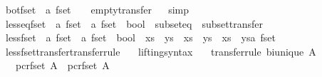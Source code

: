 \begin{isabellebody}
\ bot{\isacharunderscore}fset\ {\isacharcolon}{\isacharcolon}\ {\isachardoublequoteopen}{\isacharprime}a\ fset{\isachardoublequoteclose}\ \ {\isachardoublequoteopen}{\isacharbraceleft}{\isacharbraceright}{\isachardoublequoteclose}\ \ empty{\isacharunderscore}transfer%
\isadelimproof
\ %
\endisadelimproof
%
\isatagproof
{}\isamarkupfalse%
\ simp%
\endisatagproof
{\isafoldproof}%
%
\isadelimproof
%
\endisadelimproof
\isanewline
\isanewline
{}\isamarkupfalse%
\ less{\isacharunderscore}eq{\isacharunderscore}fset\ {\isacharcolon}{\isacharcolon}\ {\isachardoublequoteopen}{\isacharprime}a\ fset\ {\isasymRightarrow}\ {\isacharprime}a\ fset\ {\isasymRightarrow}\ bool{\isachardoublequoteclose}\ \ subset{\isacharunderscore}eq\ \ subset{\isacharunderscore}transfer\isanewline
%
\isadelimproof
\ \ %
\endisadelimproof
%
\isatagproof
\isacommand{{\isachardot}}\isamarkupfalse%
%
\endisatagproof
{\isafoldproof}%
%
\isadelimproof
\isanewline
%
\endisadelimproof
\isanewline
{}\isamarkupfalse%
\ less{\isacharunderscore}fset\ {\isacharcolon}{\isacharcolon}\ {\isachardoublequoteopen}{\isacharprime}a\ fset\ {\isasymRightarrow}\ {\isacharprime}a\ fset\ {\isasymRightarrow}\ bool{\isachardoublequoteclose}\ \ {\isachardoublequoteopen}xs\ {\isacharless}\ ys\ {\isasymequiv}\ xs\ {\isasymle}\ ys\ {\isasymand}\ xs\ {\isasymnoteq}\ {\isacharparenleft}ys{\isacharcolon}{\isacharcolon}{\isacharprime}a\ fset{\isacharparenright}{\isachardoublequoteclose}\isanewline
\isanewline
{}\isamarkupfalse%
\ less{\isacharunderscore}fset{\isacharunderscore}transfer{\isacharbrackleft}transfer{\isacharunderscore}rule{\isacharbrackright}{\isacharcolon}\isanewline
\ \ \ lifting{\isacharunderscore}syntax\isanewline
\ \ \ {\isacharbrackleft}transfer{\isacharunderscore}rule{\isacharbrackright}{\isacharcolon}\ {\isachardoublequoteopen}bi{\isacharunderscore}unique\ A{\isachardoublequoteclose}\isanewline
\ \ \ {\isachardoublequoteopen}{\isacharparenleft}{\isacharparenleft}pcr{\isacharunderscore}fset\ A{\isacharparenright}\ {\isacharequal}{\isacharequal}{\isacharequal}{\isachargreater}\ {\isacharparenleft}pcr{\isacharunderscore}fset\ A{\isacharparenright}\ {\isacharequal}{\isacharequal}{\isacharequal}{\isachargreater}\ {\isacharparenleft}{\isacharequal}{\isacharparenright}{\isacharparenright}\ {\isacharparenleft}{\isasymsubset}{\isacharparenright}\ {\isacharparenleft}{\isacharless}{\isacharparenright}{\isachardoublequoteclose}\isanewline

\end{isabellebody}
